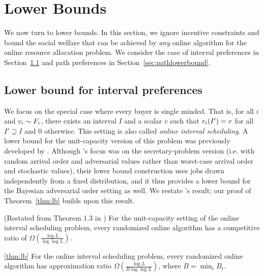 \section{Lower Bounds}
\label{sec:lowerbound}

We now turn to lower bounds. In this section, we ignore incentive
constraints and bound the social welfare that can be achieved by {\em
  any} online algorithm for the online resource allocation problem.
We consider the case of interval preferences in
Section~\ref{sec:lb-int} and path preferences in
Section~\ref{sec:pathlowerbound}.

\subsection{Lower bound for interval preferences}
\label{sec:lb-int}

We focus on the special case where every buyer is single minded. That
is, for all $i$ and $v_{i}\sim F_{i}$, there exists an interval $I$
and a scalar $v$ such that $v_{i}(I')=v$ for all $I'\supseteq I$ and
$0$ otherwise. This setting is also called {\em online interval
  scheduling}. A lower bound for the unit-capacity version of this
problem was previously developed by \citet{im2011secretary}. Although
\citeauthor{im2011secretary}'s focus was on the secretary-problem
version (i.e. with random arrival order and adversarial values rather
than worst-case arrival order and stochastic values), their lower
bound construction uses jobs drawn independently from a fixed
distribution, and it thus provides a lower bound for the Bayesian
adversarial order setting as well. We restate
\citeauthor{im2011secretary}'s result; our proof of
Theorem~\ref{thm:lb} builds upon this result.

    \begin{lemma}\label{ISSPlemma}
      (Restated from Theorem 1.3 in \cite{im2011secretary}) For the
      unit-capacity setting of the online interval scheduling problem,
      every randomized online algorithm has a competitive ratio of
      $\Omega\left(\frac{\log L}{\log\log L}\right)$.
    \end{lemma}

\begin{numberedtheorem}{\ref{thm:lb}}
  For the online interval scheduling problem, every randomized online
  algorithm has approximation ratio
  $\Omega\left(\frac{\log L}{B\log\log L}\right)$, where
  $B=\min_{t}B_t$.
\end{numberedtheorem}


